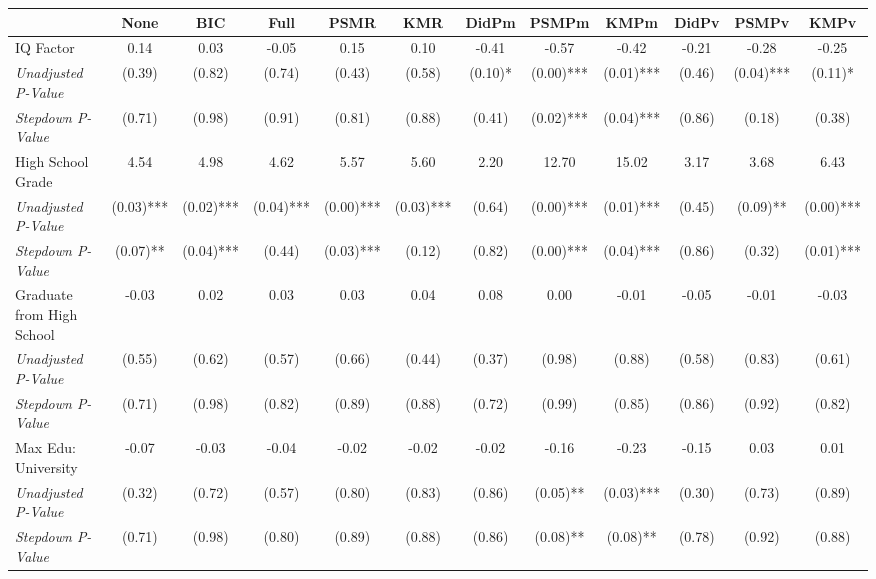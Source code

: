 \begin{tabular}{l c c c c c c c c c c c}
\toprule
 & None & BIC & Full & PSMR & KMR & DidPm & PSMPm & KMPm & DidPv & PSMPv & KMPv \\
\midrule
IQ Factor & 0.14 & 0.03 & -0.05 & 0.15 & 0.10 & -0.41 & -0.57 & -0.42 & -0.21 & -0.28 & -0.25 \\
\quad \textit{Unadjusted P-Value} & (0.39) & (0.82) & (0.74) & (0.43) & (0.58) & (0.10)* & (0.00)*** & (0.01)*** & (0.46) & (0.04)*** & (0.11)* \\
\quad \textit{Stepdown P-Value} & (0.71) & (0.98) & (0.91) & (0.81) & (0.88) & (0.41) & (0.02)*** & (0.04)*** & (0.86) & (0.18) & (0.38) \\
High School Grade & 4.54 & 4.98 & 4.62 & 5.57 & 5.60 & 2.20 & 12.70 & 15.02 & 3.17 & 3.68 & 6.43 \\
\quad \textit{Unadjusted P-Value} & (0.03)*** & (0.02)*** & (0.04)*** & (0.00)*** & (0.03)*** & (0.64) & (0.00)*** & (0.01)*** & (0.45) & (0.09)** & (0.00)*** \\
\quad \textit{Stepdown P-Value} & (0.07)** & (0.04)*** & (0.44) & (0.03)*** & (0.12) & (0.82) & (0.00)*** & (0.04)*** & (0.86) & (0.32) & (0.01)*** \\
Graduate from High School & -0.03 & 0.02 & 0.03 & 0.03 & 0.04 & 0.08 & 0.00 & -0.01 & -0.05 & -0.01 & -0.03 \\
\quad \textit{Unadjusted P-Value} & (0.55) & (0.62) & (0.57) & (0.66) & (0.44) & (0.37) & (0.98) & (0.88) & (0.58) & (0.83) & (0.61) \\
\quad \textit{Stepdown P-Value} & (0.71) & (0.98) & (0.82) & (0.89) & (0.88) & (0.72) & (0.99) & (0.85) & (0.86) & (0.92) & (0.82) \\
Max Edu: University & -0.07 & -0.03 & -0.04 & -0.02 & -0.02 & -0.02 & -0.16 & -0.23 & -0.15 & 0.03 & 0.01 \\
\quad \textit{Unadjusted P-Value} & (0.32) & (0.72) & (0.57) & (0.80) & (0.83) & (0.86) & (0.05)** & (0.03)*** & (0.30) & (0.73) & (0.89) \\
\quad \textit{Stepdown P-Value} & (0.71) & (0.98) & (0.80) & (0.89) & (0.88) & (0.86) & (0.08)** & (0.08)** & (0.78) & (0.92) & (0.88) \\
\bottomrule
\end{tabular}
